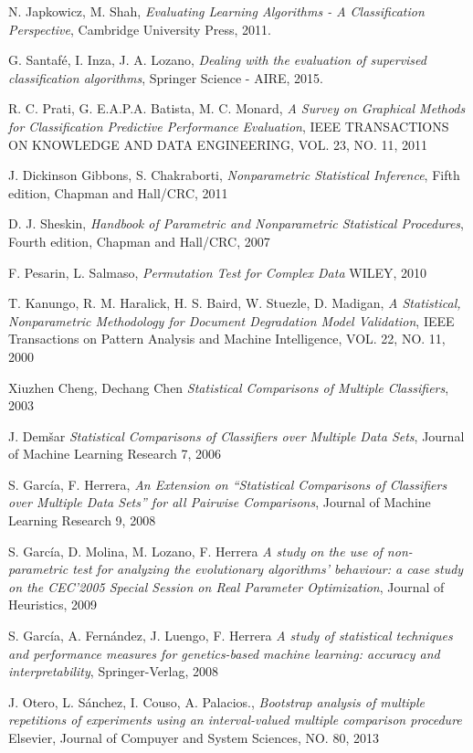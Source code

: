 \begin{thebibliography}{99}

  N. Japkowicz, M. Shah,
  \emph{Evaluating Learning Algorithms - A Classification Perspective},
  Cambridge University Press,
  2011.

  G. Santafé, I. Inza, J. A. Lozano,
  \emph{Dealing with the evaluation of supervised classification algorithms},
  Springer Science - AIRE,
  2015.
  
  R. C. Prati, G. E.A.P.A. Batista, M. C. Monard,
  \emph{A Survey on Graphical Methods for Classification Predictive Performance Evaluation},
  IEEE TRANSACTIONS ON KNOWLEDGE AND DATA ENGINEERING, VOL. 23, NO. 11,
  2011

  J. Dickinson Gibbons, S. Chakraborti,
  \emph{Nonparametric Statistical Inference},
  Fifth edition,
  Chapman and Hall/CRC,
  2011
	
  D. J. Sheskin,
  \emph{Handbook of Parametric and Nonparametric Statistical Procedures},
  Fourth edition,
  Chapman and Hall/CRC,
  2007
  
	F. Pesarin, L. Salmaso,
	\emph{Permutation Test for Complex Data}
	WILEY, 
	2010
  
	T. Kanungo, R. M. Haralick, H. S. Baird, W. Stuezle, D. Madigan,
  \emph{A Statistical, Nonparametric Methodology for Document Degradation Model Validation},
  IEEE Transactions on Pattern Analysis and Machine Intelligence,
  VOL. 22, NO. 11,
  2000
  
	Xiuzhen Cheng, Dechang Chen
  \emph{Statistical Comparisons of Multiple Classifiers},
  2003
  
	J. Dem\v{s}ar
	\emph{Statistical Comparisons of Classifiers over Multiple Data Sets},
	Journal of Machine Learning Research 7,
	2006
	
	
	S. García, F. Herrera,
	\emph{An Extension on ``Statistical Comparisons of Classifiers over Multiple Data Sets'' for all Pairwise Comparisons},
	Journal of Machine Learning Research 9,
	2008
	
	S. García, D. Molina, M. Lozano, F. Herrera
	\emph{A study on the use of non-parametric test for analyzing the evolutionary algorithms' behaviour: a case study on the CEC'2005 Special Session on Real Parameter Optimization},
	Journal of Heuristics,
	2009

	S. García, A. Fernández, J. Luengo, F. Herrera
	\emph{A study of statistical techniques and performance measures for genetics-based machine learning: accuracy and interpretability},
	Springer-Verlag,
	2008
	
	J. Otero, L. Sánchez, I. Couso, A. Palacios.,
	\emph{Bootstrap analysis of multiple repetitions of experiments using an interval-valued multiple comparison procedure}
	Elsevier, Journal of Compuyer and System Sciences,
	NO. 80,
	2013
	
\end{thebibliography}